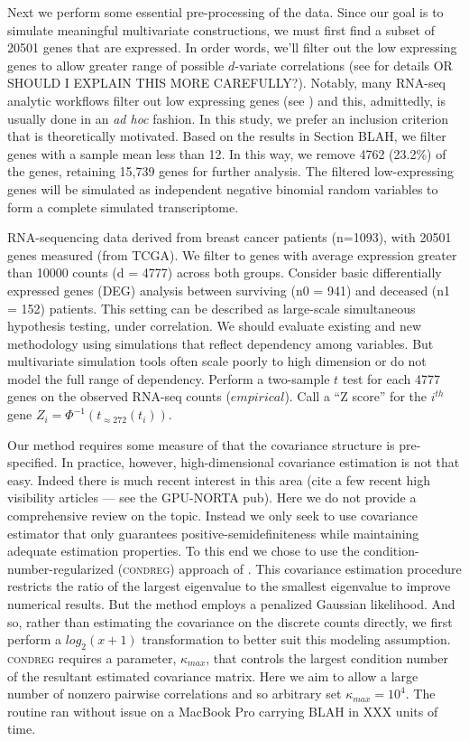 \documentclass[
]{article}
\begin{document}
Next we perform some essential pre-processing of the data. Since our goal is to simulate meaningful multivariate constructions, we must first find a subset of 20501 genes that are expressed. In order words, we'll filter out the low expressing genes to allow greater range of possible \(d\)-variate correlations (see \citet{NK10} for details OR SHOULD I EXPLAIN THIS MORE CAREFULLY?). Notably, many RNA-seq analytic workflows filter out low expressing genes (see \cite{Conesa2016b}) and this, admittedly, is usually done in an \emph {ad hoc} fashion. In this study, we prefer an inclusion criterion that is theoretically motivated. Based on the results in Section BLAH, we filter genes with a sample mean less than 12. In this way, we remove 4762 (23.2\%) of the genes, retaining 15,739 genes for further analysis. The filtered low-expressing genes will be simulated as independent negative binomial random variables to form a complete simulated transcriptome.

RNA-sequencing data derived from breast cancer patients (n=1093), with 20501 genes measured (from TCGA). We filter to genes with average expression greater than 10000 counts (d = 4777) across both groups. Consider basic differentially expressed genes (DEG) analysis between surviving (n0 = 941) and deceased (n1 = 152) patients. This setting can be described as large-scale simultaneous hypothesis testing, under correlation. We should evaluate existing and new methodology using simulations that reflect dependency among variables. But multivariate simulation tools often scale poorly to high dimension or do not model the full range of dependency. Perform a two-sample \(t\) test for each 4777 genes on the observed RNA-seq counts (\(empirical\)). Call a ``Z score'' for the \(i^{th}\) gene \(Z_{i} = \Phi^{-1}(t_{\approx 272}(t_i))\).

Our method requires some measure of that the covariance structure is pre-specified. In practice, however, high-dimensional covariance estimation is not that easy. Indeed there is much recent interest in this area (cite a few recent high visibility articles --- see the GPU-NORTA pub). Here we do not provide a comprehensive review on the topic. Instead we only seek to use covariance estimator that only guarantees positive-semidefiniteness while maintaining adequate estimation properties. To this end we chose to use the condition-number-regularized (\textsc{condreg}) approach of \cite{Won2013g}. This covariance estimation procedure restricts the ratio of the largest eigenvalue to the smallest eigenvalue to improve numerical results. But the method employs a penalized Gaussian likelihood. And so, rather than estimating the covariance on the discrete counts directly, we first perform a \(log_{2}(x +1)\) transformation to better suit this modeling assumption. \textsc{condreg} requires a parameter, \(\kappa_{max}\), that controls the largest condition number of the resultant estimated covariance matrix. Here we aim to allow a large number of nonzero pairwise correlations and so arbitrary set \(\kappa_{max}=10^{4}\). The routine ran without issue on a MacBook Pro carrying BLAH in XXX units of time.
\end{document}
